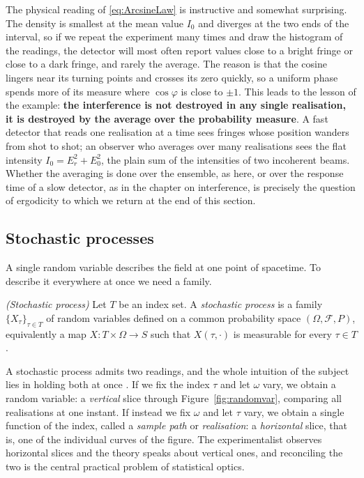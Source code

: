 		The physical reading of \eqref{eq:ArcsineLaw} is instructive and somewhat surprising.
		The density is smallest at the mean value $I_{0}$ and diverges at the two ends of the
		interval, so if we repeat the experiment many times and draw the histogram of the
		readings, the detector will most often report values close to a bright fringe or close
		to a dark fringe, and rarely the average. The reason is that the cosine lingers near its
		turning points and crosses its zero quickly, so a uniform phase spends more of its
		measure where $\cos\varphi$ is close to $\pm1$. This leads to the lesson of the example:
		\textbf{the interference is not destroyed in any single realisation, it is destroyed by
		the average over the probability measure}. A fast detector that reads one realisation
		at a time sees fringes whose position wanders from shot to shot; an observer who averages
		over many realisations sees the flat intensity $I_{0} = E_{r}^{2}+E_{0}^{2}$, the plain sum of the
		intensities of two incoherent beams. Whether the averaging is done over the ensemble, as here, or over the
		response time of a slow detector, as in the chapter on interference, is precisely the
		question of ergodicity to which we return at the end of this section.

	\subsection{Stochastic processes}

		A single random variable describes the field at one point of spacetime. To describe it
		everywhere at once we need a family.

		\begin{myDef}
			\textit{(Stochastic process)} Let $T$ be an index set. A \emph{stochastic
			process} is a family $\{X_{\tau}\}_{\tau\in T}$ of random variables defined on a
			common probability space $(\Omega,\mathcal{F},P)$, equivalently a map
			$X:T\times\Omega\to S$ such that $X(\tau,\cdot)$ is measurable for every $\tau\in T$.
		\end{myDef}

		A stochastic process admits two readings, and the whole intuition of the subject lies in
		holding both at once \citep{doob1953stochastic}. If we fix the index $\tau$ and let
		$\omega$ vary, we obtain a random variable: a \textit{vertical} slice through
		Figure~\ref{fig:randomvar}, comparing all realisations at one instant. If instead we fix
		$\omega$ and let $\tau$ vary, we obtain a single function of the index, called a
		\emph{sample path} or \emph{realisation}: a \textit{horizontal} slice, that is, one
		of the individual curves of the figure. The experimentalist observes horizontal slices
		and the theory speaks about vertical ones, and reconciling the two is the central
		practical problem of statistical optics.

